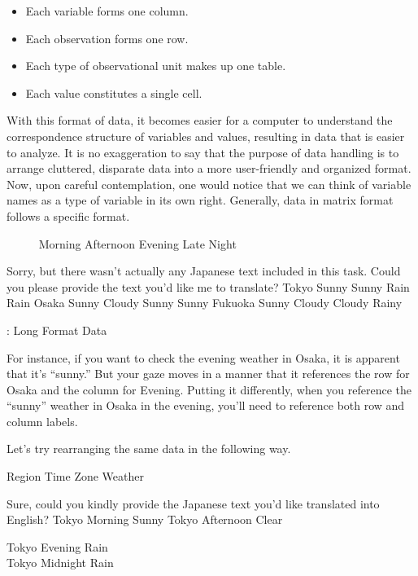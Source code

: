 \documentclass[
  a4paper,
]{book}
\providecommand{\tightlist}{%
  \setlength{\itemsep}{0pt}\setlength{\parskip}{0pt}}\usepackage{longtable,booktabs,array}
\begin{document}
\begin{itemize}
\tightlist
\item
  Each variable forms one column.
\item
  Each observation forms one row.
\item
  Each type of observational unit makes up one table.
\item
  Each value constitutes a single cell.
\end{itemize}

With this format of data, it becomes easier for a computer to understand
the correspondence structure of variables and values, resulting in data
that is easier to analyze. It is no exaggeration to say that the purpose
of data handling is to arrange cluttered, disparate data into a more
user-friendly and organized format. Now, upon careful contemplation, one
would notice that we can think of variable names as a type of variable
in its own right. Generally, data in matrix format follows a specific
format.

~~~~~\textbar{} Morning \textbar{} Afternoon \textbar{} Evening
\textbar{} Late Night \textbar{}

Sorry, but there wasn't actually any Japanese text included in this
task. Could you please provide the text you'd like me to translate?
\textbar{} Tokyo \textbar{} Sunny \textbar{} Sunny \textbar{} Rain
\textbar{} Rain \textbar{} \textbar{} Osaka \textbar{} Sunny \textbar{}
Cloudy \textbar{} Sunny \textbar{} Sunny \textbar{} \textbar{} Fukuoka
\textbar{} Sunny \textbar{} Cloudy \textbar{} Cloudy \textbar{} Rainy
\textbar{}

: Long Format Data

For instance, if you want to check the evening weather in Osaka, it is
apparent that it's ``sunny.'' But your gaze moves in a manner that it
references the row for Osaka and the column for Evening. Putting it
differently, when you reference the ``sunny'' weather in Osaka in the
evening, you'll need to reference both row and column labels.

Let's try rearranging the same data in the following way.

Region \textbar{} Time Zone \textbar{} Weather \textbar{}

Sure, could you kindly provide the Japanese text you'd like translated
into English? \textbar{} Tokyo \textbar{} Morning \textbar{} Sunny
\textbar{} \textbar{} Tokyo \textbar{} Afternoon \textbar{} Clear
\textbar{}

Tokyo \textbar{} Evening \textbar{} Rain \textbar{}\\
Tokyo \textbar{} Midnight \textbar{} Rain \textbar{}
\end{document}
